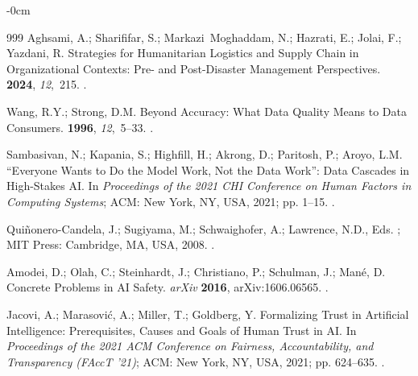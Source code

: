 \documentclass[systems,article,accept,moreauthors,pdftex]{Definitions/mdpi}
\begin{document}
\begin{adjustwidth}{-\extralength}{0cm}
\begin{thebibliography}{999}
Aghsami, A.; Sharififar, S.; Markazi~Moghaddam, N.; Hazrati, E.; Jolai, F.;
  Yazdani, R.
\newblock Strategies for Humanitarian Logistics and Supply Chain in
  Organizational Contexts: Pre- and Post-Disaster Management Perspectives.
 {\bf 2024}, {\em 12},~215.
.

Wang, R.Y.; Strong, D.M.
\newblock Beyond Accuracy: What Data Quality Means to Data Consumers.
 {\bf 1996}, {\em
  12},~5--33.
.

Sambasivan, N.; Kapania, S.; Highfill, H.; Akrong, D.; Paritosh, P.; Aroyo,
  L.M.
\newblock ``Everyone Wants to Do the Model Work, Not the Data Work'': Data
  Cascades in High-Stakes {AI}.
\newblock In \emph{Proceedings of the 2021 CHI Conference on Human
  Factors in Computing Systems}; ACM: New York, NY, USA, 2021; pp. 1--15.
.

Qui{\~n}onero-Candela, J.; Sugiyama, M.; Schwaighofer, A.; Lawrence, N.D., Eds.
; MIT Press: Cambridge, MA,
  USA,  2008.
.

Amodei, D.; Olah, C.; Steinhardt, J.; Christiano, P.; Schulman, J.; Man{\'e},
  D.
\newblock Concrete Problems in {AI} Safety.
\newblock \emph{arXiv} \textbf{2016}, arXiv:1606.06565.
.

Jacovi, A.; Marasovi{\'c}, A.; Miller, T.; Goldberg, Y.
\newblock Formalizing Trust in Artificial Intelligence: Prerequisites, Causes
  and Goals of Human Trust in {AI}.
\newblock In \emph{Proceedings of the 2021 ACM Conference on
  Fairness, Accountability, and Transparency (FAccT '21)};  ACM: New York, NY, USA, 2021; pp. 624--635.
.


\end{thebibliography}
\end{adjustwidth}
\end{document}
